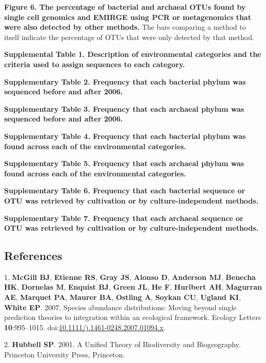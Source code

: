 \documentclass[11pt,]{article}
\begin{document}
\textbf{Figure 6. The percentage of bacterial and archaeal OTUs found by
single cell genomics and EMIRGE using PCR or metagenomics that were also
detected by other methods.} The bars comparing a method to itself
indicate the percentage of OTUs that were only detected by that method.

\newpage

\textbf{Supplemental Table 1. Description of environmental categories
and the criteria used to assign sequences to each category.}

\textbf{Supplementary Table 2. Frequency that each bacterial phylum was
sequenced before and after 2006.}

\textbf{Supplementary Table 3. Frequency that each archaeal phylum was
sequenced before and after 2006.}

\textbf{Supplementary Table 4. Frequency that each bacterial phylum was
found across each of the environmental categories.}

\textbf{Supplementary Table 5. Frequency that each archaeal phylum was
found across each of the environmental categories.}

\textbf{Supplementary Table 6. Frequency that each bacterial sequence or
OTU was retrieved by cultivation or by culture-independent methods.}

\textbf{Supplementary Table 7. Frequency that each archaeal sequence or
OTU was retrieved by cultivation or by culture-independent methods.}

\newpage

\subsection*{References}\label{references}

\hypertarget{refs}{}
\hypertarget{ref-McGill2007}{}
1. \textbf{McGill BJ}, \textbf{Etienne RS}, \textbf{Gray JS},
\textbf{Alonso D}, \textbf{Anderson MJ}, \textbf{Benecha HK},
\textbf{Dornelas M}, \textbf{Enquist BJ}, \textbf{Green JL}, \textbf{He
F}, \textbf{Hurlbert AH}, \textbf{Magurran AE}, \textbf{Marquet PA},
\textbf{Maurer BA}, \textbf{Ostling A}, \textbf{Soykan CU},
\textbf{Ugland KI}, \textbf{White EP}. 2007. Species abundance
distributions: Moving beyond single prediction theories to integration
within an ecological framework. Ecology Letters \textbf{10}:995--1015.
doi:\href{https://doi.org/10.1111/j.1461-0248.2007.01094.x}{10.1111/j.1461-0248.2007.01094.x}.

\hypertarget{ref-Hubbell2001}{}
2. \textbf{Hubbell SP}. 2001. A Unified Theory of Biodiversity and
Biogeography. Princeton University Press, Princeton.
\end{document}
